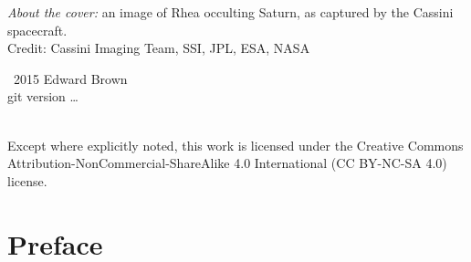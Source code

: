 
\maketitle
\newpage
\begin{fullwidth}
\thispagestyle{empty}

\vspace{3\baselineskip}
\noindent \emph{About the cover:} an image of Rhea occulting Saturn, as captured by the Cassini spacecraft.\\
\noindent Credit: Cassini Imaging Team, SSI, JPL, ESA, NASA

\vfill
\noindent \ccCopy\ 2015 Edward Brown\\
\noindent git version \ldots

\vspace{3\baselineskip}
\noindent \ccbyncsa \\
\noindent Except where explicitly noted, this work is licensed under the Creative Commons
Attribution-NonCommercial-ShareAlike 4.0 International (CC BY-NC-SA
4.0) license.

\end{fullwidth}
\newpage
\chapter*{Preface}


\tableofcontents
\listoffigures
